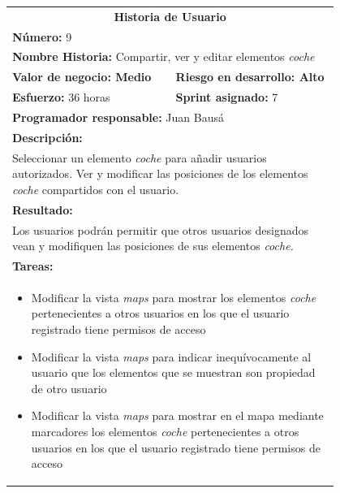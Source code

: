 	\begin{table}[H]
	  \centering 
	 	\begin{tabular}{p{0.4\linewidth}p{0.4\linewidth}}
	    \toprule
	    \multicolumn{2}{c}{\cellcolor{black!30}\textbf{Historia de Usuario}} 													\\
		\multicolumn{2}{l}{\cellcolor{gray!25}\textbf{Número: }9}																\\
		\multicolumn{2}{l}{\textbf{Nombre Historia: } Compartir, ver y editar elementos \textit{coche}}						\\
		\cellcolor{gray!25}\textbf{Valor de negocio: Medio}	&	\cellcolor{gray!25}\textbf{Riesgo en desarrollo: Alto}		\\
		\textbf{Esfuerzo:} 36 horas				&	\textbf{Sprint asignado: }7 												\\
		\multicolumn{2}{l}{\cellcolor{gray!25}\textbf{Programador responsable: }Juan Bausá}									\\
		\multicolumn{2}{l}{\textbf{Descripción:}}                                                     						\\
		\multicolumn{2}{l}{\parbox{15cm}{Seleccionar un elemento \textit{coche} para añadir usuarios autorizados. Ver y modificar las posiciones de los elementos \textit{coche} compartidos con el usuario.}}				\\
		\multicolumn{2}{l}{\cellcolor{gray!25}\textbf{Resultado:}}																\\		
		\multicolumn{2}{l}{\parbox{15cm}{Los usuarios podrán permitir que otros usuarios designados vean y modifiquen las posiciones de sus elementos \textit{coche.}}}																								\\
		\multicolumn{2}{l}{\textbf{Tareas:}}																					\\
		\multicolumn{2}{l}{
			\begin{minipage}{12cm}
	    		\vskip 4pt
	    		\begin{itemize}
	    			\item Modificar la vista \textit{maps} para mostrar los elementos \textit{coche} pertenecientes a otros usuarios en los que el usuario registrado tiene permisos de acceso
	    			\item Modificar la vista \textit{maps} para indicar inequívocamente al usuario que los elementos que se muestran son propiedad de otro usuario
	    			\item Modificar la vista \textit{maps} para mostrar en el mapa mediante marcadores los elementos \textit{coche} pertenecientes a otros usuarios en los que el usuario registrado tiene permisos de acceso

\end{itemize}
\end{minipage}}
\end{tabular}
\end{table}
